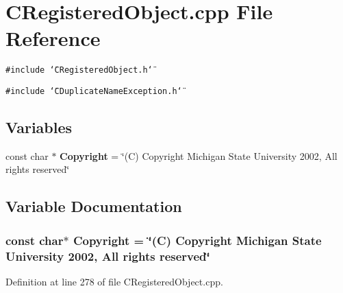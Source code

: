 \section{CRegistered\-Object.cpp File Reference}
\label{CRegisteredObject_8cpp}
{\tt \#include \char`\"{}CRegistered\-Object.h\char`\"{}}\par
{\tt \#include \char`\"{}CDuplicate\-Name\-Exception.h\char`\"{}}\par
\subsection*{Variables}
\begin{CompactItemize}
\item 
const char $\ast$ {\bf Copyright} = \char`\"{}(C) Copyright Michigan State University 2002, All rights reserved\char`\"{}
\end{CompactItemize}


\subsection{Variable Documentation}
\subsubsection{\setlength{\rightskip}{0pt plus 5cm}const char$\ast$ Copyright = \char`\"{}(C) Copyright Michigan State University 2002, All rights reserved\char`\"{}\hspace{0.3cm}{\tt  [static]}}\label{CRegisteredObject_8cpp_a0}




Definition at line 278 of file CRegistered\-Object.cpp.